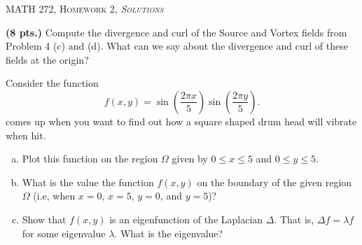 \documentclass[12pt]{article} %
\begin{document}
\begin{center}
   \textsc{\large MATH 272, Homework 2, \emph{Solutions}}\\
\end{center}
\vspace{.5cm}

\begin{problem}
\textbf{(8 pts.)} Compute the divergence and curl of the Source and Vortex fields from Problem 4 (c) and (d).  What can we say about the divergence and curl of these fields at the origin?
\end{problem}

\begin{problem}
Consider the function
\[
f(x,y)=\sin\left(\frac{2\pi x}{5}\right)\sin\left(\frac{2\pi y}{5}\right).
\]
comes up when you want to find out how a square shaped drum head will vibrate when hit.
\begin{enumerate}[(a)]
    \item Plot this function on the region $\Omega$ given by $0\leq x \leq 5$ and $0\leq y \leq 5$.
    \item What is the value the function $f(x,y)$ on the boundary of the given region $\Omega$ (i.e, when $x=0$, $x=5$, $y=0$, and $y=5$)?
    \item Show that $f(x,y)$ is an eigenfunction of the Laplacian $\Delta$. That is, $\Delta f = \lambda f$ for some eigenvalue $\lambda$. What is the eigenvalue?
\end{enumerate}
\end{problem}
\end{document}
